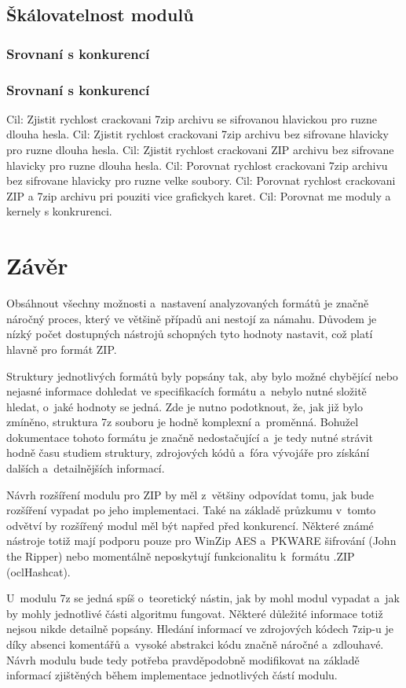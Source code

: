 \section{Škálovatelnost modulů}
\subsection{Srovnaní s konkurencí}
\subsection{Srovnaní s konkurencí}
Cil: Zjistit rychlost crackovani 7zip archivu se sifrovanou hlavickou pro ruzne dlouha hesla.
Cil: Zjistit rychlost crackovani 7zip archivu bez sifrovane hlavicky pro ruzne dlouha hesla.
Cil: Zjistit rychlost crackovani ZIP archivu bez sifrovane hlavicky pro ruzne dlouha hesla.
Cil: Porovnat rychlost crackovani 7zip archivu bez sifrovane hlavicky pro ruzne velke soubory.
Cil: Porovnat rychlost crackovani ZIP a 7zip archivu pri pouziti vice grafickych karet.
Cil: Porovnat me moduly a kernely s konkrurenci.

\chapter{Závěr}
Obsáhnout všechny možnosti a~nastavení analyzovaných formátů je značně náročný proces, který
ve většině případů ani nestojí za námahu. Důvodem je nízký počet dostupných nástrojů schopných tyto
hodnoty nastavit, což platí hlavně pro formát ZIP.

 Struktury jednotlivých formátů byly popsány tak, aby bylo možné chybějící nebo nejasné informace
dohledat ve specifikacích formátu a~nebylo nutné složitě hledat, o~jaké hodnoty se jedná. Zde
je nutno podotknout, že, jak již bylo zmíněno, struktura 7z souboru je hodně komplexní a~proměnná.
Bohužel dokumentace tohoto formátu je značně nedostačující a~je tedy nutné strávit hodně času
studiem struktury, zdrojových kódů a~fóra vývojáře pro získání dalších a~detailnějších informací.

 Návrh rozšíření modulu pro ZIP by měl z~většiny odpovídat tomu, jak bude rozšíření vypadat po jeho
implementaci. Také na základě průzkumu v~tomto odvětví by rozšířený modul měl být napřed před
konkurencí. Některé známé nástroje totiž mají podporu pouze pro WinZip AES a~PKWARE šifrování
(John the Ripper) nebo momentálně neposkytují funkcionalitu k~formátu .ZIP (oclHashcat).  

 U~modulu 7z se jedná spíš o~teoretický nástin, jak by mohl modul vypadat a~jak by
mohly jednotlivé části algoritmu fungovat. Některé důležité informace totiž nejsou nikde detailně
popsány. Hledání informací ve zdrojových kódech 7zip-u je díky absenci komentářů a~vysoké
abstrakci kódu značně náročné a~zdlouhavé. Návrh modulu bude tedy potřeba pravděpodobně
modifikovat na základě informací zjištěných během implementace jednotlivých částí modulu.

